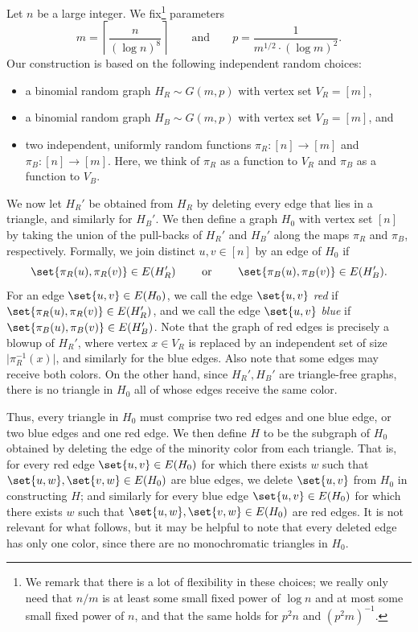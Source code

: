 \documentclass[11pt,reqno,oneside]{amsart}
\theoremstyle{definition}
\newcommand\margindef[1]{\marginpar{\textcolor{gray!70!black}{\scriptsize #1}}}
\newcommand\ab[1]{\lvert#1\rvert}
\newcommand\1{\mathbf{1}}
\begin{document}
Let $n$ be a large integer. We fix\footnote{We remark that there is a lot of flexibility in these choices; we really only need that $n/m$ is at least some small fixed power of $\log n$ and at most some small fixed power of $n$, and that the same holds for $p^2 n$ and $(p^2 m)^{-1}$.} parameters\margindef{$n,m,p$}
\[
	m = \left\lceil\frac{n}{(\log n)^{8}}\right\rceil\qquad\text{and} \qquad p = \frac{1}{m^{1/2}\cdot (\log m)^2}.
\]
Our construction is based on the following independent random choices: 
\begin{itemize}
	\item a binomial random graph $H_R \sim G(m,p)$ with vertex set $V_R=[m]$,\margindef{$H_R$}
	\item a binomial random graph $H_B \sim G(m,p)$ with vertex set $V_B=[m]$, and\margindef{$H_B$}
	\item two independent, uniformly random functions $\pi_R:[n] \to [m]$ and $\pi_B:[n] \to [m]$.\margindef{$\pi_R,\pi_B$} Here, we think of $\pi_R$ as a function to $V_R$ and $\pi_B$ as a function to $V_B$.
\end{itemize}
We now let $H_R'$ be obtained from $H_R$ by deleting every edge that lies in a triangle, and similarly for $H_B'$\margindef{$H_R',H_B',H_0$}. We then define a graph $H_0$ with vertex set $[n]$ by taking the union of the pull-backs of $H_R'$ and $H_B'$ along the maps $\pi_R$ and $\pi_B$, respectively. Formally, we join distinct $u,v \in [n]$ by an edge of $H_0$ if
\[
	\set{\pi_R(u),\pi_R(v)} \in E(H_R') \qquad\text{ or }\qquad \set{\pi_B(u),\pi_B(v)} \in E(H_B').
\]
For an edge $\set{u,v} \in E(H_0)$, we call the edge $\set{u,v}$ \emph{red} if $\set{\pi_R(u),\pi_R(v)} \in E(H_R')$, and we call the edge $\set{u,v}$ \emph{blue} if $\set{\pi_B(u),\pi_B(v)} \in E(H_B')$. Note that the graph of red edges is precisely a blowup of $H_R'$, where vertex $x \in V_R$ is replaced by an independent set of size $\ab{\pi_R^{-1}(x)}$, and similarly for the blue edges. Also note that some edges may receive both colors. On the other hand, since $H_R',H_B'$ are triangle-free graphs, there is no triangle in $H_0$ all of whose edges receive the same color. 

Thus, every triangle in $H_0$ must comprise two red edges and one blue edge, or two blue edges and one red edge. We then define $H$\margindef{$H$} to be the subgraph of $H_0$ obtained by deleting the edge of the minority color from each triangle. That is, for every red edge $\set{u,v} \in E(H_0)$ for which there exists $w$ such that $\set{u,w},\set{v,w} \in E(H_0)$ are blue edges, we delete $\set{u,v}$ from $H_0$ in constructing $H$; and similarly for every blue edge $\set{u,v} \in E(H_0)$ for which there exists $w$ such that $\set{u,w},\set{v,w} \in E(H_0)$ are red edges. It is not relevant for what follows, but it may be helpful to note that every deleted edge has only one color, since there are no monochromatic triangles in $H_0$. 
\end{document}
